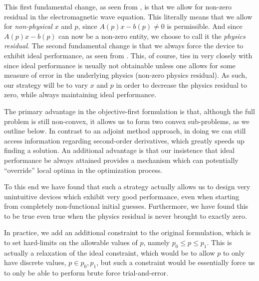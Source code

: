 This first fundamental change, as seen from ,
    is that we allow for non-zero residual in the electromagnetic wave equation.
This literally means that we allow for \emph{non-physical} $x$ and $p$,
    since $A(p) x - b(p) \ne 0$ is permissible.
And since $A(p) x - b(p)$ can now be a non-zero entity, 
    we choose to call it the \emph{physics residual}.  
The second fundamental change
    is that we always force the device to exhibit ideal performance,
    as seen from .
This, of course, ties in very closely with  since
    ideal performance is usually not obtainable unless one
    allows for some measure of error in the underlying physics
    (non-zero physics residual).
As such, our strategy will be to vary $x$ and $p$
    in order to decrease the physics residual  to zero,
    while always maintaining ideal performance.

The primary advantage in the objective-first formulation is that,
    although the full problem is still non-convex,
    it allows us to form two convex sub-problems, as we outline below.
In contrast to an adjoint method approach,
    in doing we can still access information regarding
    second-order derivatives, which greatly speeds up finding a solution.
An additional advantage is that our insistence
    that ideal performance be always attained
    provides a mechanism
    which can potentially ``override'' local optima 
    in the optimization process.

To this end we have found that such a strategy
    actually allows us to design very unintuitive devices
    which exhibit very good performance,
    even when starting from completely non-functional initial guesses.
Furthermore, we have found this to be true
    even true when the physics residual is never brought to exactly zero.


In practice, we add an additional constraint to the original formulation, \cite{opex1}
    which is to set hard-limits on the allowable values of $p$,
    namely $p_0 \le p \le p_1$.
This is actually a relaxation of the ideal constraint,
    which would be to allow $p$ to only have discrete values,
    $p \in p_0, p_1$,
    but such a constraint would be essentially force us to only
    be able to perform brute force trial-and-error.

